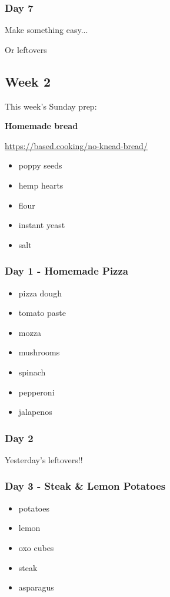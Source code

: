 \documentclass[11pt, a4paper]{article}
\begin{document}
\subsubsection{Day 7}
\vspace{1pc}
\noindent Make something easy...
\par
Or leftovers


\vspace{0.917 pc} %

\pagebreak
\subsection{Week 2}

This week's Sunday prep:
\par
\noindent\textbf{Homemade bread}
\par
\small{\url{https://based.cooking/no-knead-bread/}}
\begin{itemize}
\item poppy seeds
\item hemp hearts
\item flour
\item instant yeast
\item salt
\end{itemize}

\subsubsection{Day 1 - Homemade Pizza}
\vspace{1pc}
\begin{itemize}
\item pizza dough
\item tomato paste
\item mozza
\item mushrooms
\item spinach
\item pepperoni
\item jalapenos
\end{itemize}

\subsubsection{Day 2}
\vspace{1pc}
Yesterday's leftovers!!

\subsubsection{Day 3 - Steak \& Lemon Potatoes}
\vspace{1pc}
\begin{itemize}
\item potatoes
\item lemon
\item oxo cubes
\item steak
\item asparagus
\end{itemize}
\end{document}
